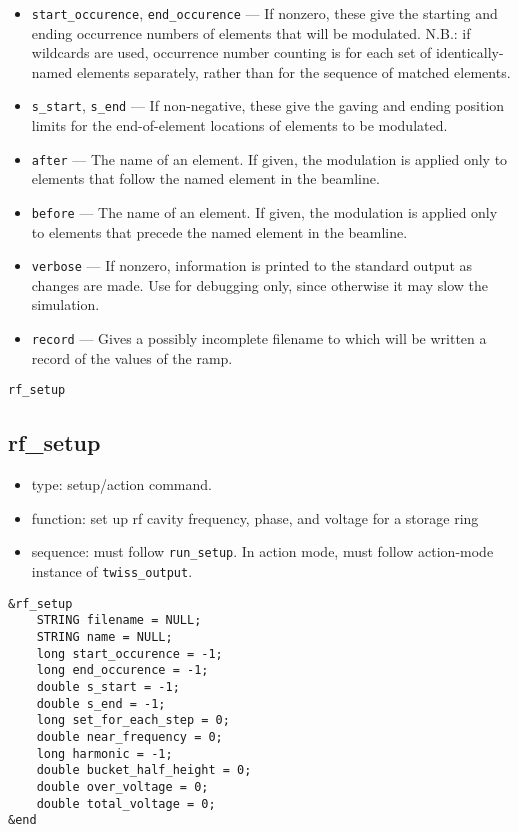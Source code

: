 \documentclass[11pt]{article}
\begin{document}
\begin{itemize}
\begin{itemize}
  \end{itemize}
\item \verb|start_occurence|, \verb|end_occurence| --- If nonzero, these give the starting and
 ending occurrence numbers of elements that will be modulated. N.B.: if wildcards are used, occurrence
 number counting is for each set of identically-named elements separately, rather than for the sequence
 of matched elements.
\item \verb|s_start|, \verb|s_end| --- If non-negative, these give the gaving and ending position
 limits for the end-of-element locations of elements to be modulated.
\item \verb|after| --- The name of an element.  If given, the modulation is applied only to elements
 that follow the named element in the beamline.  
\item \verb|before| --- The name of an element.  If given, the modulation is applied only to elements
 that precede the named element in the beamline. 
\item \verb|verbose| --- If nonzero, information is printed to the standard output as changes are
        made.  Use for debugging only, since otherwise it may slow the simulation.
\item \verb|record| --- Gives a possibly incomplete filename to which will be written a record of the values of
  the ramp.
\end{itemize}

\newpage
\begin{center}{\Large\verb|rf_setup|}\end{center}
\subsection{rf\_setup\label{subsec:rfsetup}}

\begin{itemize}
\item type: setup/action command.
\item function: set up rf cavity frequency, phase, and voltage for a storage ring
\item sequence: must follow \verb|run_setup|. In action mode, must follow action-mode instance of \verb|twiss_output|.
\end{itemize}

\begin{verbatim}
&rf_setup
    STRING filename = NULL;
    STRING name = NULL;
    long start_occurence = -1;
    long end_occurence = -1;
    double s_start = -1;
    double s_end = -1;
    long set_for_each_step = 0;
    double near_frequency = 0; 
    long harmonic = -1;
    double bucket_half_height = 0;
    double over_voltage = 0;
    double total_voltage = 0;
&end
\end{verbatim}
\end{document}
